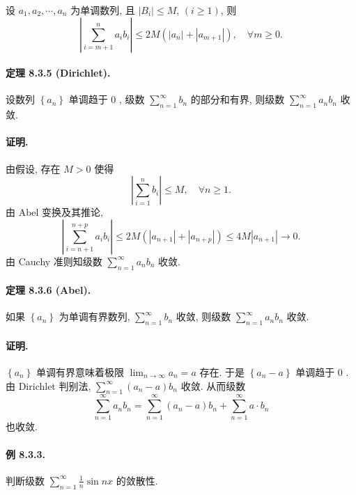 设 $a_{1},a_{2},\cdots,a_{n}$ 为单调数列, 且 $\left|B_{i}\right|\leqslant M$,
$(i\geqslant1)$, 则 
\[
\left|\sum_{i=m+1}^{n}a_{i}b_{i}\right|\leqslant2M\left(\left|a_{n}\right|+\left|a_{m+1}\right|\right),\quad\forall m\geqslant0.
\]


\paragraph{定理 8.3.5 (Dirichlet). }

设数列 $\left\{ a_{n}\right\} $ 单调趋于 0 , 级数 $\sum_{n=1}^{\infty}b_{n}$
的部分和有界, 则级数 $\sum_{n=1}^{\infty}a_{n}b_{n}$ 收敛.

\paragraph{证明. }

由假设, 存在 $M>0$ 使得 
\[
\left|\sum_{i=1}^{n}b_{i}\right|\leqslant M,\quad\forall n\geqslant1.
\]
由 Abel 变换及其推论, 
\[
\left|\sum_{i=n+1}^{n+p}a_{i}b_{i}\right|\leqslant2M\left(\left|a_{n+1}\right|+\left|a_{n+p}\right|\right)\leqslant4M\left|a_{n+1}\right|\rightarrow0.
\]
由 Cauchy 准则知级数 $\sum_{n=1}^{\infty}a_{n}b_{n}$ 收敛.

\paragraph{定理 8.3.6 (Abel). }

如果 $\left\{ a_{n}\right\} $ 为单调有界数列, $\sum_{n=1}^{\infty}b_{n}$
收敛, 则级数 $\sum_{n=1}^{\infty}a_{n}b_{n}$ 收敛.

\paragraph{证明. }

$\left\{ a_{n}\right\} $ 单调有界意味着极限 $\lim_{n\rightarrow\infty}a_{n}=a$
存在. 于是 $\left\{ a_{n}-a\right\} $ 单调趋于 0 . 由 Dirichlet 判别法, $\sum_{n=1}^{\infty}\left(a_{n}-a\right)b_{n}$
收敛. 从而级数 
\[
\sum_{n=1}^{\infty}a_{n}b_{n}=\sum_{n=1}^{\infty}\left(a_{n}-a\right)b_{n}+\sum_{n=1}^{\infty}a\cdot b_{n}
\]
也收敛.

\paragraph{例 8.3.3. }

判断级数 $\sum_{n=1}^{\infty}\frac{1}{n}\sin nx$ 的敛散性.

